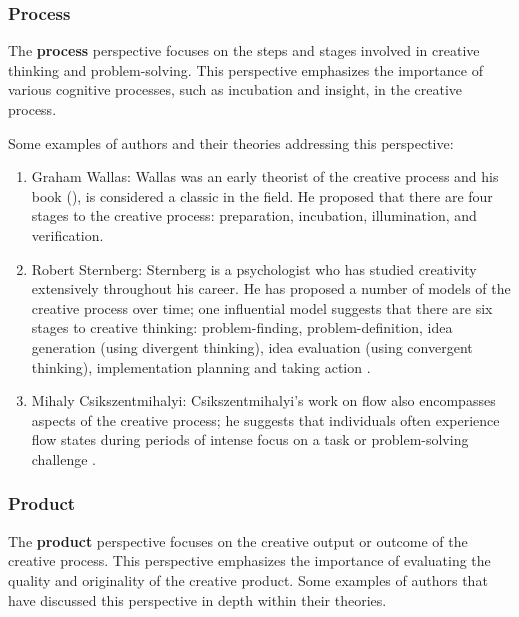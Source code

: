 \subsubsection{Process}

The \textbf{process} perspective focuses on the steps and stages involved in creative thinking and problem-solving. This perspective emphasizes the importance of various cognitive processes, such as incubation and insight, in the creative process.

Some examples of authors and their theories addressing this perspective:

\begin{enumerate}
\item  Graham Wallas: Wallas was an early theorist of the creative process and his book  (\citeyear{Wallas1926}), is considered a classic in the field. He proposed that there are four stages to the creative process: preparation, incubation, illumination, and verification.

\item Robert Sternberg: Sternberg is a psychologist who has studied creativity extensively throughout his career. He has proposed a number of models of the creative process over time; one influential model suggests that there are six stages to creative thinking: problem-finding, problem-definition, idea generation (using divergent thinking), idea evaluation (using convergent thinking), implementation planning and taking action \citep{Sternberg1988,Sternberg2003}.

\item Mihaly Csikszentmihalyi: Csikszentmihalyi's work on flow also encompasses aspects of the creative process; he suggests that individuals often experience flow states during periods of intense focus on a task or problem-solving challenge \citep{Csikszentmihalyi1990}.
\end{enumerate}

\subsubsection{Product}

The \textbf{product} perspective focuses on the creative output or outcome of the creative process. This perspective emphasizes the importance of evaluating the quality and originality of the creative product. Some examples of authors that have discussed this perspective in depth within their theories.

